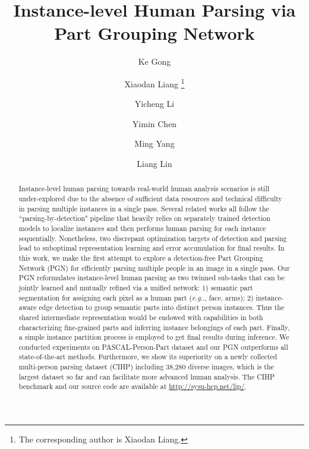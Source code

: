\documentclass[runningheads]{llncs}
\makeatletter
\DeclareRobustCommand\onedot{\futurelet\@let@token\@onedot}
\def\@onedot{\ifx\@let@token.\else.\null\fi\xspace}
\def\eg{\emph{e.g}\onedot} \def\Eg{\emph{E.g}\onedot}
\makeatother
\begin{document}
\title{Instance-level Human Parsing via Part Grouping Network}

\author{Ke Gong \and
Xiaodan Liang \thanks{The corresponding author is Xiaodan Liang.}\and
Yicheng Li \and
Yimin Chen \and
Ming Yang \and
Liang Lin}

\maketitle              %
\begin{abstract}
Instance-level human parsing towards real-world human analysis scenarios is still under-explored due to the absence of sufficient data resources and technical difficulty in parsing multiple instances in a single pass. Several related works all follow the ``parsing-by-detection" pipeline that heavily relies on separately trained detection models to localize instances and then performs human parsing for each instance sequentially. Nonetheless, two discrepant optimization targets of detection and parsing lead to suboptimal representation learning and error accumulation for final results. In this work, we make the first attempt to explore a detection-free Part Grouping Network (PGN) for efficiently parsing multiple people in an image in a single pass. Our PGN reformulates instance-level human parsing as two twinned sub-tasks that can be jointly learned and mutually refined via a unified network: 1) semantic part segmentation for assigning each pixel as a human part (\eg, face, arms); 2) instance-aware edge detection to group semantic parts into distinct person instances. Thus the shared intermediate representation would be endowed with capabilities in both characterizing fine-grained parts and inferring instance belongings of each part. Finally, a simple instance partition process is employed to get final results during inference. We conducted experiments on PASCAL-Person-Part dataset and our PGN outperforms all state-of-the-art methods. Furthermore, we show its superiority on a newly collected multi-person parsing dataset (CIHP) including 38,280 diverse images, which is the largest dataset so far and can facilitate more advanced human analysis. The CIHP benchmark and our source code are available at \url{http://sysu-hcp.net/lip/}.

\end{abstract}
\end{document}
